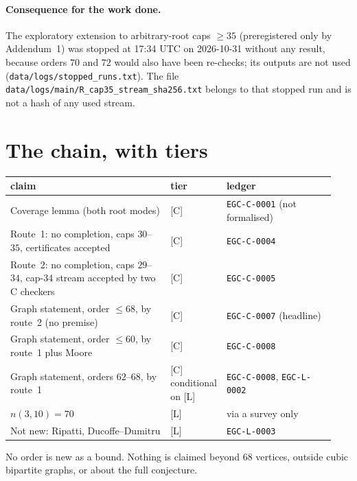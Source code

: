 \documentclass[10pt]{article}
\newcommand{\tier}[1]{\textsf{[#1]}}
\newcommand{\tL}{\tier{L}}
\newcommand{\tC}{\tier{C}}
\begin{document}
\paragraph{Consequence for the work done.} The exploratory extension to arbitrary-root caps $\ge35$ (preregistered only by Addendum~1) was stopped at 17:34 UTC on 2026-10-31 without any result, because orders $70$ and $72$ would also have been re-checks; its outputs are not used (\texttt{data/logs/stopped\_runs.txt}). The file \texttt{data/logs/main/R\_cap35\_stream\_sha256.txt} belongs to that stopped run and is not a hash of any used stream.

\section{The chain, with tiers}\label{sec:tiers}
\begin{center}\small
\begin{tabular}{@{}p{0.50\linewidth}p{0.10\linewidth}p{0.34\linewidth}@{}}
\toprule claim & tier & ledger \\ \midrule
Coverage lemma (both root modes) & \tC{} & \texttt{EGC-C-0001} (not formalised) \\
Route~1: no completion, caps $30$--$35$, certificates accepted & \tC{} & \texttt{EGC-C-0004} \\
Route~2: no completion, caps $29$--$34$, cap-34 stream accepted by two C checkers & \tC{} & \texttt{EGC-C-0005} \\
Graph statement, order $\le68$, by route~2 (no premise) & \tC{} & \texttt{EGC-C-0007} (headline) \\
Graph statement, order $\le60$, by route~1 plus Moore & \tC{} & \texttt{EGC-C-0008} \\
Graph statement, orders $62$--$68$, by route~1 & \tC{} conditional on \tL{} & \texttt{EGC-C-0008}, \texttt{EGC-L-0002} \\
$n(3,10)=70$ & \tL{} & via a survey only \\
Not new: Ripatti, Ducoffe--Dumitru & \tL{} & \texttt{EGC-L-0003} \\
\bottomrule
\end{tabular}
\end{center}
No order is new as a bound. Nothing is claimed beyond $68$ vertices, outside cubic bipartite graphs, or about the full conjecture.

\end{document}

